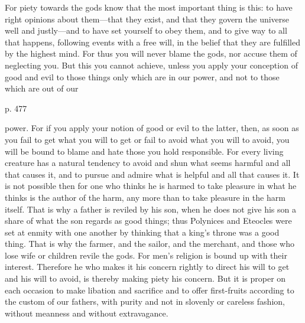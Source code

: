 For piety towards the gods know that  the most important thing is this: to have
right opinions about them—that they exist,  and that they govern the universe
well and justly—and to have set yourself to obey them, and to give way to all
that happens, following  events with a free  will, in the belief  that they are
fulfilled by  the highest  mind. For thus  you will never  blame the  gods, nor
accuse them  of neglecting you. But  this you cannot achieve,  unless you apply
your conception of good  and evil to those things only which  are in our power,
and not to those which are out of our

p. 477

power. For  if you apply your  notion of good or  evil to the latter,  then, as
soon as you fail to get what you will  to get or fail to avoid what you will to
avoid, you  will be  bound to blame  and hate those  you hold  responsible. For
every  living creature  has a  natural tendency  to avoid  and shun  what seems
harmful and all  that causes it, and  to pursue and admire what  is helpful and
all that causes it. It is not possible  then for one who thinks he is harmed to
take pleasure  in what he thinks  is the author of  the harm, any more  than to
take pleasure in the  harm itself. That is why a father is  reviled by his son,
when he does not  give his son a share of what the  son regards as good things;
thus Polynices  and Eteocles were  set at enmity  with one another  by thinking
that a king's throne was a good thing.  That is why the farmer, and the sailor,
and the  merchant, and  those who lose  wife or children  revile the  gods. For
men's religion is bound  up with their interest. Therefore he  who makes it his
concern rightly  to direct his will  to get and  his will to avoid,  is thereby
making piety his  concern. But it is  proper on each occasion  to make libation
and sacrifice and to offer first-fruits according to the custom of our fathers,
with  purity and  not in  slovenly or  careless fashion,  without meanness  and
without extravagance.
